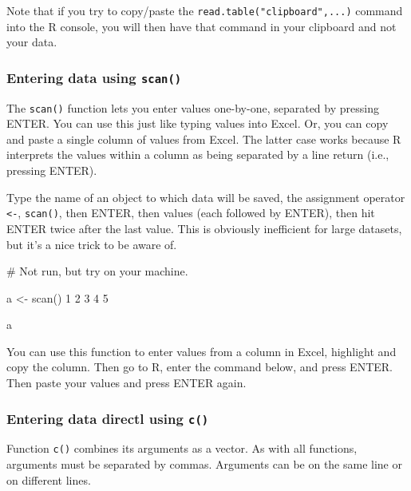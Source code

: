 \documentclass[
  13,
  letterpaper,
]{report}
\newenvironment{Shaded}{\begin{snugshade}}{\end{snugshade}}
\newcommand{\CommentTok}[1]{\textcolor[rgb]{0.37,0.37,0.37}{#1}}
\newcommand{\DecValTok}[1]{\textcolor[rgb]{0.68,0.00,0.00}{#1}}
\newcommand{\FunctionTok}[1]{\textcolor[rgb]{0.28,0.35,0.67}{#1}}
\newcommand{\NormalTok}[1]{\textcolor[rgb]{0.00,0.23,0.31}{#1}}
\newcommand{\OtherTok}[1]{\textcolor[rgb]{0.00,0.23,0.31}{#1}}
\begin{document}
Note that if you try to copy/paste the
\texttt{read.table("clipboard",...)} command into the R console, you
will then have that command in your clipboard and not your data.

\subsubsection{\texorpdfstring{Entering data using
\texttt{scan()}}{Entering data using scan()}}\label{sec-ie-import-special-scan}

The \texttt{scan()} function lets you enter values one-by-one, separated
by pressing ENTER. You can use this just like typing values into Excel.
Or, you can copy and paste a single column of values from Excel. The
latter case works because R interprets the values within a column as
being separated by a line return (i.e., pressing ENTER).

Type the name of an object to which data will be saved, the assignment
operator \texttt{\textless{}-}, \texttt{scan()}, then ENTER, then values
(each followed by ENTER), then hit ENTER twice after the last value.
This is obviously inefficient for large datasets, but it's a nice trick
to be aware of.

\begin{Shaded}
\begin{Highlighting}[]
\CommentTok{\# Not run, but try on your machine.}

\NormalTok{a }\OtherTok{\textless{}{-}} \FunctionTok{scan}\NormalTok{()}
\DecValTok{1}
\DecValTok{2}
\DecValTok{3}
\DecValTok{4}
\DecValTok{5}


\NormalTok{a}
\end{Highlighting}
\end{Shaded}

You can use this function to enter values from a column in Excel,
highlight and copy the column. Then go to R, enter the command below,
and press ENTER. Then paste your values and press ENTER again.

\subsubsection{\texorpdfstring{Entering data directl using
\texttt{c()}}{Entering data directl using c()}}\label{sec-ie-import-special-c}

Function \texttt{c()} combines its arguments as a vector. As with all
functions, arguments must be separated by commas. Arguments can be on
the same line or on different lines.
\end{document}
